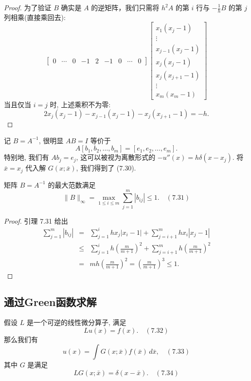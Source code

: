 \documentclass[a4paper]{ctexart}
\newcommand{\hl}[1]
{\noindent {\bf {#1}}}
\begin{document}
\begin{proof}
为了验证 $B$ 确实是 $A$ 的逆矩阵，我们只需将 $h^2 A$ 的第 $i$ 行与 $-\frac{1}{h} B$ 
的第 $j$ 列相乘(直接乘回去): 
$$
\begin{bmatrix}
0 & \cdots & 0 & -1 & 2 & -1 & 0 & \cdots & 0
\end{bmatrix}
\begin{bmatrix}
x_1(x_j - 1) \\
\vdots \\
x_{j-1}(x_j - 1) \\
x_j(x_j - 1) \\
x_j(x_{j+1} - 1) \\
\vdots \\
x_m(x_m - 1)
\end{bmatrix}
$$
当且仅当 $i = j$ 时, 上述乘积不为零:
$$
2x_j(x_j - 1) - x_{j-1}(x_j - 1) - x_j(x_{j+1} - 1) = -h.
$$
\end{proof}

记 $B = A^{-1}$, 很明显 $AB = I$ 等价于 
$$
A[b_1, b_2, \ldots, b_m] = [e_1, e_2, \ldots, e_m].
$$
特别地, 我们有 $Ab_j = e_j$, 这可以被视为离散形式的 $-u''(x) = h\delta(x - x_j)$. 
将 $\bar{x} = x_j$ 代入解 $G(x; \bar{x})$, 我们得到了 (7.30).

\hl{定理 7.32} 矩阵 $B = A^{-1}$ 的最大范数满足
$$
\|B\|_{\infty} 
= \max_{1 \leq i \leq m} \sum_{j = 1}^{m} |b_{ij}| \leq 1. \quad (7.31)
$$

\begin{proof}
引理 7.31 给出
\begin{eqnarray*}
\sum_{j = 1}^{m} |b_{ij}| 
&=& \sum_{j = 1}^{i} h x_j |x_i - 1| 
+ \sum_{j=i+1}^{m} h x_i |x_j - 1| \\
&\leq& \sum_{j = 1}^{i} h 
\left(\frac{m}{m+1}\right)^2 
+ \sum_{j = i + 1}^{m} h 
\left(\frac{m}{m+1}\right)^2 \\
&=& mh \left(\frac{m}{m + 1}\right)^2 
= \left(\frac{m}{m+1}\right)^3 \leq 1.
\end{eqnarray*}   
\end{proof}

\subsection{通过Green函数求解}

\hl{引理 7.33} 假设 $L$ 是一个可逆的线性微分算子, 满足
$$
L u(x) = f(x). \quad (7.32)
$$
那么我们有
$$
u(x) = \int G(x; \bar{x})f(\bar{x}) \, d\bar{x}, \quad (7.33)
$$
其中 $G$ 是满足
$$
LG(x; \bar{x}) = \delta(x - \bar{x}). \quad (7.34)
$$
\end{document}

